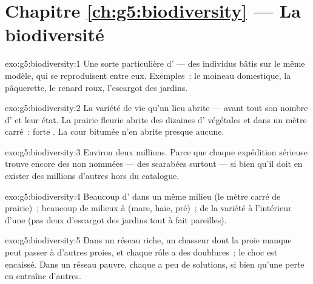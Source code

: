 \section*{Chapitre \ref{ch:g5:biodiversity} --- La biodiversité}

\begin{solution}{exo:g5:biodiversity:1}
Une sorte particulière d' --- des individus bâtis sur le
même modèle, qui se reproduisent entre eux. Exemples~: le moineau
domestique, la pâquerette, le renard roux, l'escargot des jardins.
\end{solution}

\begin{solution}{exo:g5:biodiversity:2}
La variété de vie qu'un lieu abrite --- avant tout son nombre
d' et leur état. La prairie fleurie abrite des dizaines
d' végétales et  dans un mètre carré~: forte
. La cour bitumée n'en abrite presque aucune.
\end{solution}

\begin{solution}{exo:g5:biodiversity:3}
Environ deux millions. Parce que chaque expédition sérieuse trouve
encore des  non nommées --- des scarabées surtout --- si
bien qu'il doit en exister des millions d'autres hors du catalogue.
\end{solution}

\begin{solution}{exo:g5:biodiversity:4}
Beaucoup d' dans un même milieu (le mètre carré de prairie)~;
beaucoup de milieux  à  (mare, haie, pré)~; de la variété à
l'intérieur d'une  (pas deux  d'escargot des jardins
tout à fait pareilles).
\end{solution}

\begin{solution}{exo:g5:biodiversity:5}
Dans un réseau riche, un chasseur dont la proie manque peut passer à
d'autres proies, et chaque rôle a des doublures~; le choc est
encaissé. Dans un réseau pauvre, chaque  a peu de solutions,
si bien qu'une perte en entraîne d'autres.
\end{solution}

